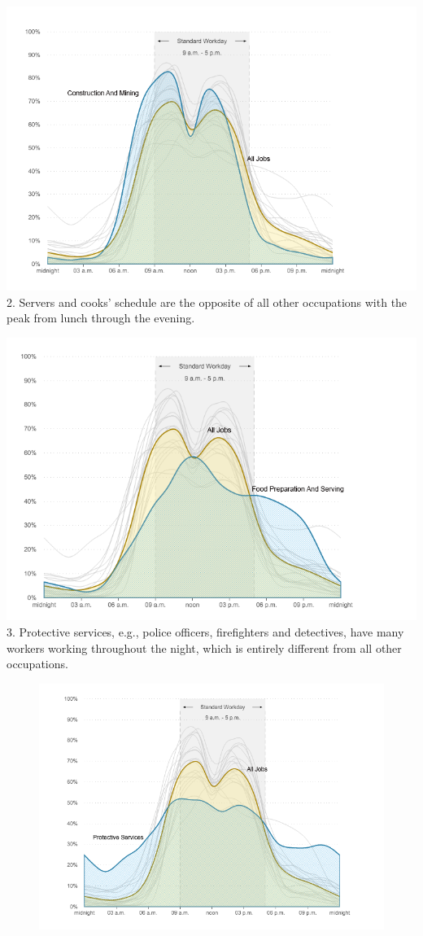 \documentclass[]{book}
\theoremstyle{definition}
\theoremstyle{definition}
\theoremstyle{definition}
\theoremstyle{remark}
\begin{document}
\includegraphics{images/construction.png} 2. Servers and cooks' schedule
are the opposite of all other occupations with the peak from lunch
through the evening.

\includegraphics{images/server_cook.png} 3. Protective services, e.g.,
police officers, firefighters and detectives, have many workers working
throughout the night, which is entirely different from all other
occupations.

\begin{figure}
\centering
\includegraphics{images/protective.png}
\caption{}
\end{figure}
\end{document}
